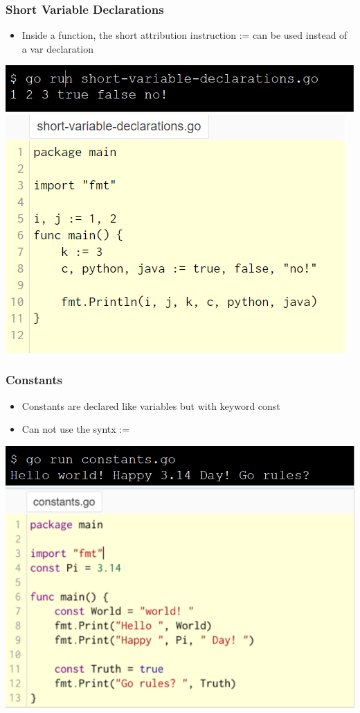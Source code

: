 \documentclass[14pt]{beamer}
\begin{document}
{
\begin{frame}
    \frametitle{Short Variable Declarations}
    \begin{itemize}
        \item Inside a function, the short attribution instruction := can be used instead of a var declaration
    \end{itemize}
    \begin{center}
        \includegraphics[width=0.6\linewidth]{img/shortdeclarationcommand.PNG}
        \includegraphics[width=0.6\linewidth]{img/shortdeclaration.PNG}
    \end{center}
\end{frame}
}

{
\begin{frame}
    \frametitle{Constants}
    \begin{itemize}
        \item Constants are declared like variables but with keyword const
        \item Can not use the syntx :=
    \end{itemize}
    \begin{center}
        \includegraphics[width=0.6\linewidth]{img/constants.PNG}
    \end{center}
\end{frame}
}
\end{document}
